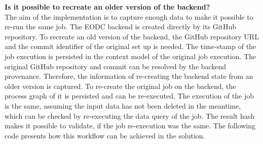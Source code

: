 \documentclass[draft,final]{vutinfth} %
\begin{document}
\textbf{Is it possible to recreate an older version of the backend?} \\
The aim of the implementation is to capture enough data to make it possible to re-run the same job. The EODC backend is created directly by its GitHub repository. To recreate an old version of the backend, the GitHub repository URL and the commit identifier of the original set up is needed. The time-stamp of the job execution is persisted in the context model of the original job execution. The original GitHub repository and commit can be resolved by the backend provenance. Therefore, the information of re-creating the backend state from an older version is captured. To re-create the original job on the backend, the process graph of it is persisted and can be re-executed. The execution of the job is the same, assuming the input data has not been deleted in the meantime, which can be checked by re-executing the data query of the job. The result hash makes it possible to validate, if the job re-execution was the same. The following code presents how this workflow can be achieved in the solution.
\end{document}
